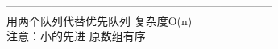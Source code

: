 ﻿-----------------------------------------------------------------------\\
用两个队列代替优先队列 复杂度O(n)\\
注意：小的先进 原数组有序
